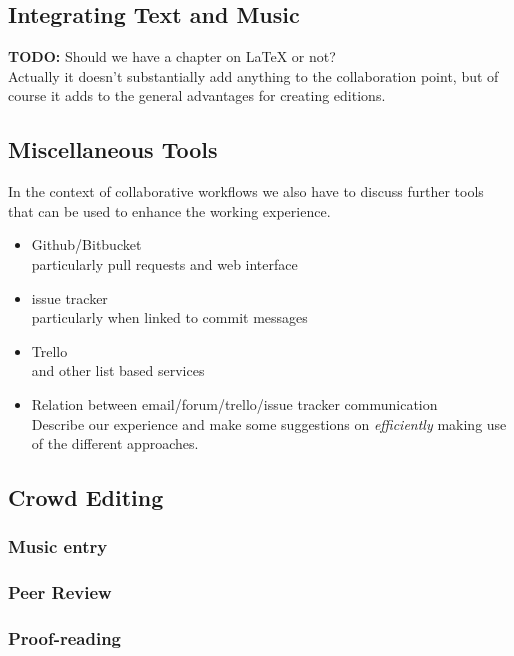 \documentclass[11pt,a4paper]{article}
\begin{document}
\subsection{Integrating Text and Music}
\textbf{TODO:} Should we have a chapter on LaTeX or not?\\
Actually it doesn't substantially add anything to the collaboration point,
but of course it adds to the general advantages for creating editions.

\subsection{Miscellaneous Tools}
In the context of collaborative workflows we also have to discuss further tools that
can be used to enhance the working experience.

\begin{itemize}
\item Github/Bitbucket\\
particularly pull requests and web interface
\item issue tracker\\
particularly when linked to commit messages
\item Trello\\
and other list based services
\item Relation between email/forum/trello/issue tracker communication\\
Describe our experience and make some suggestions on \emph{efficiently} making use
of the different approaches.
\end{itemize}

\subsection{Crowd Editing}

\subsubsection{Music entry}

\subsubsection{Peer Review}

\subsubsection{Proof-reading}
\end{document}
